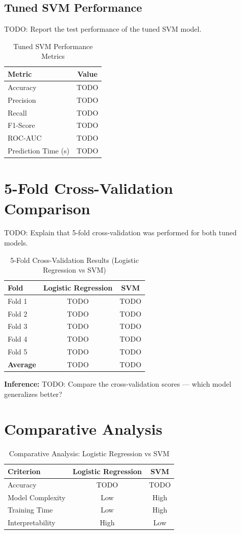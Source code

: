 \documentclass[12pt,a4paper]{article}
\begin{document}
\subsection{Tuned SVM Performance}
TODO: Report the test performance of the tuned SVM model.

\begin{table}[H]
\centering
\begin{tabular}{lc}
\toprule
\textbf{Metric} & \textbf{Value} \\ \midrule
Accuracy & TODO \\
Precision & TODO \\
Recall & TODO \\
F1-Score & TODO \\
ROC-AUC & TODO \\
Prediction Time (s) & TODO \\
\bottomrule
\end{tabular}
\caption{Tuned SVM Performance Metrics}
\end{table}

\section{5-Fold Cross-Validation Comparison}
TODO: Explain that 5-fold cross-validation was performed for both tuned models.

\begin{table}[H]
\centering
\begin{tabular}{lcc}
\toprule
\textbf{Fold} & \textbf{Logistic Regression} & \textbf{SVM} \\ \midrule
Fold 1 & TODO & TODO \\
Fold 2 & TODO & TODO \\
Fold 3 & TODO & TODO \\
Fold 4 & TODO & TODO \\
Fold 5 & TODO & TODO \\
\textbf{Average} & TODO & TODO \\
\bottomrule
\end{tabular}
\caption{5-Fold Cross-Validation Results (Logistic Regression vs SVM)}
\end{table}

\textbf{Inference:}
TODO: Compare the cross-validation scores — which model generalizes better?

\section{Comparative Analysis}
\begin{table}[H]
\centering
\begin{tabular}{lcc}
\toprule
\textbf{Criterion} & \textbf{Logistic Regression} & \textbf{SVM} \\ \midrule
Accuracy & TODO & TODO \\
Model Complexity & Low & High \\
Training Time & Low & High \\
Interpretability & High & Low \\
\bottomrule
\end{tabular}
\caption{Comparative Analysis: Logistic Regression vs SVM}
\end{table}
\end{document}
